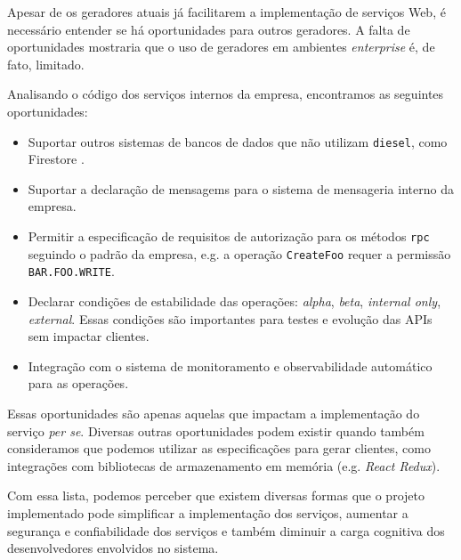 Apesar de os geradores atuais já facilitarem a implementação de serviços Web, é necessário
entender se há oportunidades para outros geradores. A falta de oportunidades mostraria que
o uso de geradores em ambientes \textit{enterprise} é, de fato, limitado.

Analisando o código dos serviços internos da empresa, encontramos as seguintes oportunidades:

\begin{itemize}
\item Suportar outros sistemas de bancos de dados que não utilizam \texttt{diesel}, como
  Firestore \cite{google:megastore}.
\item Suportar a declaração de mensagems para o sistema de mensageria interno da empresa.
\item Permitir a especificação de requisitos de autorização para os métodos \texttt{rpc}
  seguindo o padrão da empresa, e.g. a operação \texttt{CreateFoo} requer a permissão
  \texttt{BAR.FOO.WRITE}.
\item Declarar condições de estabilidade das operações: \textit{alpha}, \textit{beta},
  \textit{internal only}, \textit{external}. Essas condições são importantes para testes
  e evolução das APIs sem impactar clientes.
\item Integração com o sistema de monitoramento e observabilidade automático para as operações.
\end{itemize}

Essas oportunidades são apenas aquelas que impactam a implementação do serviço \textit{per se}.
Diversas outras oportunidades podem existir quando também consideramos que podemos utilizar
as especificações para gerar clientes, como integrações com bibliotecas de armazenamento em
memória (e.g. \textit{React Redux}).

Com essa lista, podemos perceber que existem diversas formas que o projeto implementado pode
simplificar a implementação dos serviços, aumentar a segurança e confiabilidade dos serviços
e também diminuir a carga cognitiva dos desenvolvedores envolvidos no sistema.
